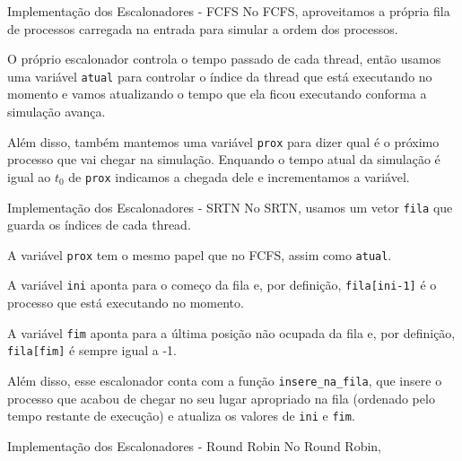 \documentclass[10pt]{beamer}
\begin{document}
    \begin{frame}{Implementação dos Escalonadores - FCFS}
        No FCFS, aproveitamos a própria fila de processos carregada na entrada para
        simular a ordem dos processos.

        O próprio escalonador controla o tempo passado de cada thread, então usamos
        uma variável \texttt{atual} para controlar o índice da thread que está
        executando no momento e vamos atualizando o tempo que ela ficou executando
        conforma a simulação avança.

        Além disso, também mantemos uma variável \texttt{prox} para dizer qual é
        o próximo processo que vai chegar na simulação. Enquando o tempo atual da
        simulação é igual ao $t_0$ de \texttt{prox} indicamos a chegada dele e
        incrementamos a variável.

    \end{frame}

    \begin{frame}{Implementação dos Escalonadores - SRTN}
        No SRTN, usamos um vetor \texttt{fila} que guarda os índices de cada thread.

        A variável \texttt{prox} tem o mesmo papel que no FCFS, assim como
        \texttt{atual}.

        A variável \texttt{ini} aponta para o começo da fila e, por definição,
        \texttt{fila[ini-1]} é o processo que está executando no momento.

        A variável \texttt{fim} aponta para a última posição não ocupada da fila e,
        por definição, \texttt{fila[fim]} é sempre igual a -1.

        Além disso, esse escalonador conta com a função \texttt{insere\_na\_fila}, que
        insere o processo que acabou de chegar no seu lugar apropriado na fila
        (ordenado pelo tempo restante de execução) e atualiza os valores de
        \texttt{ini} e \texttt{fim}.
    \end{frame}

    \begin{frame}{Implementação dos Escalonadores - Round Robin}
        No Round Robin,
    \end{frame}
\end{document}
